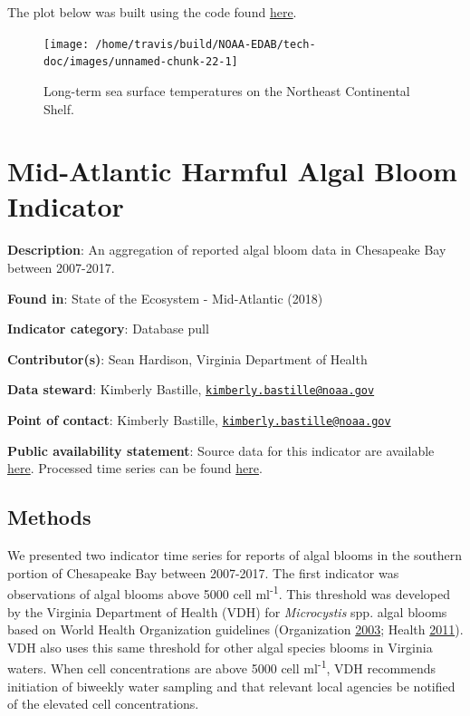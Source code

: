 \documentclass[
]{book}
\begin{document}
The plot below was built using the code found
\href{https://github.com/NOAA-EDAB/ecodata/blob/master/chunk-scripts/LTL.Rmd-long-term-sst.R}{here}.

\begin{figure}

{\centering \texttt{[image: /home/travis/build/NOAA-EDAB/tech-doc/images/unnamed-chunk-22-1]} 

}

\caption{Long-term sea surface temperatures on the Northeast Continental Shelf.}\label{fig:unnamed-chunk-22}
\end{figure}

\hypertarget{mid-atlantic-harmful-algal-bloom-indicator}{%
\chapter{Mid-Atlantic Harmful Algal Bloom Indicator}\label{mid-atlantic-harmful-algal-bloom-indicator}}

\textbf{Description}: An aggregation of reported algal bloom data in Chesapeake Bay between 2007-2017.

\textbf{Found in}: State of the Ecosystem - Mid-Atlantic (2018)

\textbf{Indicator category}: Database pull

\textbf{Contributor(s)}: Sean Hardison, Virginia Department of Health

\textbf{Data steward}: Kimberly Bastille, \href{mailto:kimberly.bastille@noaa.gov}{\nolinkurl{kimberly.bastille@noaa.gov}}

\textbf{Point of contact}: Kimberly Bastille, \href{mailto:kimberly.bastille@noaa.gov}{\nolinkurl{kimberly.bastille@noaa.gov}}

\textbf{Public availability statement}: Source data for this indicator are available \href{https://github.com/NOAA-EDAB/tech-doc/tree/master/data/CB_HAB}{here}. Processed time series can be found \href{http://comet.nefsc.noaa.gov/erddap/tabledap/CBhabs_ann_soe_v2.html}{here}.

\hypertarget{methods-23}{%
\section{Methods}\label{methods-23}}

We presented two indicator time series for reports of algal blooms in the southern portion of Chesapeake Bay between 2007-2017. The first indicator was observations of algal blooms above 5000 cell ml\textsuperscript{-1}. This threshold was developed by the Virginia Department of Health (VDH) for \emph{Microcystis} spp. algal blooms based on World Health Organization guidelines (Organization \protect\hyperlink{ref-WHO2003}{2003}; Health \protect\hyperlink{ref-VDH2011}{2011}). VDH also uses this same threshold for other algal species blooms in Virginia waters. When cell concentrations are above 5000 cell ml\textsuperscript{-1}, VDH recommends initiation of biweekly water sampling and that relevant local agencies be notified of the elevated cell concentrations.
\end{document}
